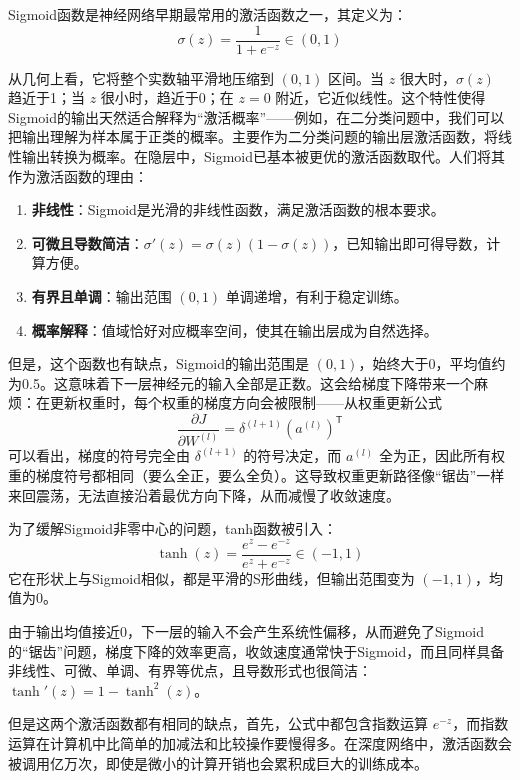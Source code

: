 \documentclass[lang=cn,zihao=-4,a4paper,fontset=windows]{beautybook}
\renewcommand{\partial}{∂}
\begin{document}
\begin{definition}
Sigmoid函数是神经网络早期最常用的激活函数之一，其定义为：
\[
\sigma(z) = \frac{1}{1 + e^{-z}} \in (0, 1)
\]
\end{definition}
从几何上看，它将整个实数轴平滑地压缩到 $(0,1)$ 区间。当 $z$ 很大时，$\sigma(z)$ 趋近于1；当 $z$ 很小时，趋近于0；在 $z=0$ 附近，它近似线性。这个特性使得Sigmoid的输出天然适合解释为“激活概率”——例如，在二分类问题中，我们可以把输出理解为样本属于正类的概率。主要作为二分类问题的输出层激活函数，将线性输出转换为概率。在隐层中，Sigmoid已基本被更优的激活函数取代。人们将其作为激活函数的理由：
    \begin{enumerate}
        \item \textbf{非线性}：Sigmoid是光滑的非线性函数，满足激活函数的根本要求。
        \item \textbf{可微且导数简洁}：$\sigma'(z) = \sigma(z)(1-\sigma(z))$，已知输出即可得导数，计算方便。
        \item \textbf{有界且单调}：输出范围 $(0,1)$ 单调递增，有利于稳定训练。
        \item \textbf{概率解释}：值域恰好对应概率空间，使其在输出层成为自然选择。
    \end{enumerate}
但是，这个函数也有缺点，Sigmoid的输出范围是 $(0,1)$，始终大于0，平均值约为0.5。这意味着下一层神经元的输入全部是正数。这会给梯度下降带来一个麻烦：在更新权重时，每个权重的梯度方向会被限制——从权重更新公式 \[\dfrac{\partial J}{\partial W^{(l)}} = \delta^{(l+1)} (a^{(l)})^{\mathsf{T}}\]可以看出，梯度的符号完全由 $\delta^{(l+1)}$ 的符号决定，而 $a^{(l)}$ 全为正，因此所有权重的梯度符号都相同（要么全正，要么全负）。这导致权重更新路径像“锯齿”一样来回震荡，无法直接沿着最优方向下降，从而减慢了收敛速度。

\begin{definition}[][双曲正切函数]
为了缓解Sigmoid非零中心的问题，tanh函数被引入：
\[
\tanh(z) = \frac{e^{z} - e^{-z}}{e^{z} + e^{-z}} \in (-1, 1)
\]
它在形状上与Sigmoid相似，都是平滑的S形曲线，但输出范围变为 $(-1,1)$，均值为0。
\end{definition}
由于输出均值接近0，下一层的输入不会产生系统性偏移，从而避免了Sigmoid的“锯齿”问题，梯度下降的效率更高，收敛速度通常快于Sigmoid，而且同样具备非线性、可微、单调、有界等优点，且导数形式也很简洁：$\tanh'(z) = 1 - \tanh^2(z)$。

但是这两个激活函数都有相同的缺点，首先，公式中都包含指数运算 $e^{-z}$，而指数运算在计算机中比简单的加减法和比较操作要慢得多。在深度网络中，激活函数会被调用亿万次，即使是微小的计算开销也会累积成巨大的训练成本。
\end{document}
